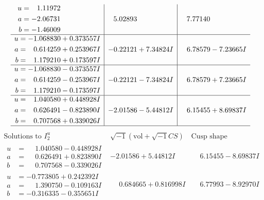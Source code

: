 \documentclass[1p]{elsarticle_modified}
\theoremstyle{definition}
\newcommand{\I}{\sqrt{-1}}
\begin{document}
$$\begin{array}{c|c|c}
\begin{aligned}
u &= \phantom{-}1.11972\phantom{ +0.000000I} \\
a &= -2.06731\phantom{ +0.000000I} \\
b &= -1.46009\phantom{ +0.000000I}\end{aligned}
 & \phantom{-}5.02893\phantom{ +0.000000I} & \phantom{-}7.77140\phantom{ +0.000000I} \\ \hline\begin{aligned}
u &= -1.068830 + 0.373557 I \\
a &= \phantom{-}0.614259 + 0.253967 I \\
b &= \phantom{-}1.179210 + 0.173597 I\end{aligned}
 & -0.22121 + 7.34824 I & \phantom{-}6.78579 - 7.23665 I \\ \hline\begin{aligned}
u &= -1.068830 - 0.373557 I \\
a &= \phantom{-}0.614259 - 0.253967 I \\
b &= \phantom{-}1.179210 - 0.173597 I\end{aligned}
 & -0.22121 - 7.34824 I & \phantom{-}6.78579 + 7.23665 I \\ \hline\begin{aligned}
u &= \phantom{-}1.040580 + 0.448928 I \\
a &= \phantom{-}0.626491 - 0.823890 I \\
b &= \phantom{-}0.707568 + 0.339026 I\end{aligned}
 & -2.01586 - 5.44812 I & \phantom{-}6.15455 + 8.69837 I\\
 \hline 
 \end{array}$$\newpage$$\begin{array}{c|c|c}  
\text{Solutions to }I^u_{2}& \I (\text{vol} + \sqrt{-1}CS) & \text{Cusp shape}\\
 \hline 
\begin{aligned}
u &= \phantom{-}1.040580 - 0.448928 I \\
a &= \phantom{-}0.626491 + 0.823890 I \\
b &= \phantom{-}0.707568 - 0.339026 I\end{aligned}
 & -2.01586 + 5.44812 I & \phantom{-}6.15455 - 8.69837 I \\ \hline\begin{aligned}
u &= -0.773805 + 0.242392 I \\
a &= \phantom{-}1.390750 - 0.109163 I \\
b &= -0.316335 - 0.355651 I\end{aligned}
 & \phantom{-}0.684665 + 0.816998 I & \phantom{-}6.77993 - 8.92970 I \\ \hline\begin{aligned}

\end{aligned}
\end{array}$$
\end{document}
